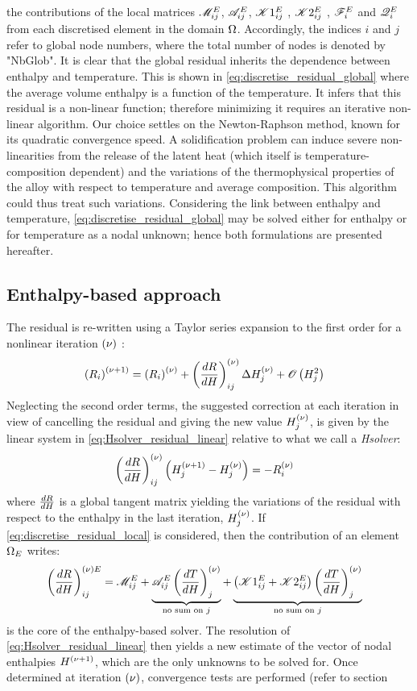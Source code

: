 the contributions of the local matrices $\mathscr{M}_{ij}^E$, $\mathscr{A}_{ij}^E$, $\mathscr{K}1_{ij}^E$ , $\mathscr{K}2_{ij}^E$ , $\mathscr{F}_{i}^E$ and $\mathscr{Q}_{i}^E$ from each discretised 
element in the domain $\Omega$. Accordingly, the indices $i$ and $j$ refer to global node numbers, where the total number of nodes is 
denoted by "NbGlob". It is clear that the global residual inherits the dependence between enthalpy and temperature. 
This is shown in \cref{eq:discretise_residual_global} where the average volume enthalpy is a function of the temperature. It infers that this residual 
is a non-linear function; therefore minimizing it requires an iterative non-linear algorithm. Our choice settles on the 
Newton-Raphson method, known for its quadratic convergence speed. A solidification problem can induce severe non-linearities 
from the release of the latent heat (which itself is temperature-composition dependent) and the variations of the thermophysical 
properties of the alloy with respect to temperature and average composition. This algorithm could thus treat such variations. 
Considering the link between enthalpy and temperature, \cref{eq:discretise_residual_global} may be solved either for enthalpy 
or for temperature as a nodal unknown; hence both formulations are presented hereafter.
%
%
\subsection{Enthalpy-based approach }
The residual is re-written using a Taylor series expansion to the first order for a nonlinear iteration ${\left( \nu \right)}$ :
\begin{align}
\label{eq:Hsolver_residual}
& \left( R_i \right)^{{\left( \nu+1 \right)}} = \left( R_i \right)^{{\left( \nu \right)}} + \left( \frac{dR}{dH} \right)^{{\left( \nu \right)}}_{ij} \Delta H_j^{{\left( \nu \right)}} + \mathscr{O}\left( H_j^2 \right)
\end{align}
Neglecting the second order terms, the suggested correction at each iteration in view of cancelling 
the residual and giving the new value $H_j^{{\left( \nu \right)}}$, is given by the linear system in \cref{eq:Hsolver_residual_linear}
relative to what we call a \emph{Hsolver}:
\begin{align}
\label{eq:Hsolver_residual_linear}
& \left( \frac{dR}{dH} \right)^{{\left( \nu \right)}}_{ij} \left( H_j^{{\left( \nu+1 \right)}} - H_j^{{\left( \nu \right)}} \right) = -R_i^{{\left( \nu \right)}}
\end{align}
where $\frac{dR}{dH}$ is a global tangent matrix yielding the variations of the residual with respect to the enthalpy 
in the last iteration, $H_j^{{\left( \nu \right)}}$. If \cref{eq:discretise_residual_local} is considered, then the contribution of an element $\Omega_E$ writes:
\begin{align}
\label{eq:dRdH}
& \left( \frac{dR}{dH} \right)^{{\left( \nu \right)} E}_{ij} 
= \mathscr{M}_{ij}^E 
+ \underbrace{\mathscr{A}_{ij}^E \left( \frac{dT}{dH} \right)^{{\left( \nu \right)}}_{j}}_{\text{no sum on }j}
+ \underbrace{\left( \mathscr{K}1_{ij}^E + \mathscr{K}2_{ij}^E \right) \left( \frac{dT}{dH} \right)^{{\left( \nu \right)}}_{j}}_{\text{no sum on }j}
\end{align}
 is the core of the enthalpy-based solver. The resolution of \cref{eq:Hsolver_residual_linear} 
then yields a new estimate of the vector of nodal enthalpies $H^{{\left( \nu+1 \right)}}$, which are the only unknowns to be solved for. 
Once determined at iteration ${\left( \nu \right)}$, convergence tests are performed (refer to section %
%
%
